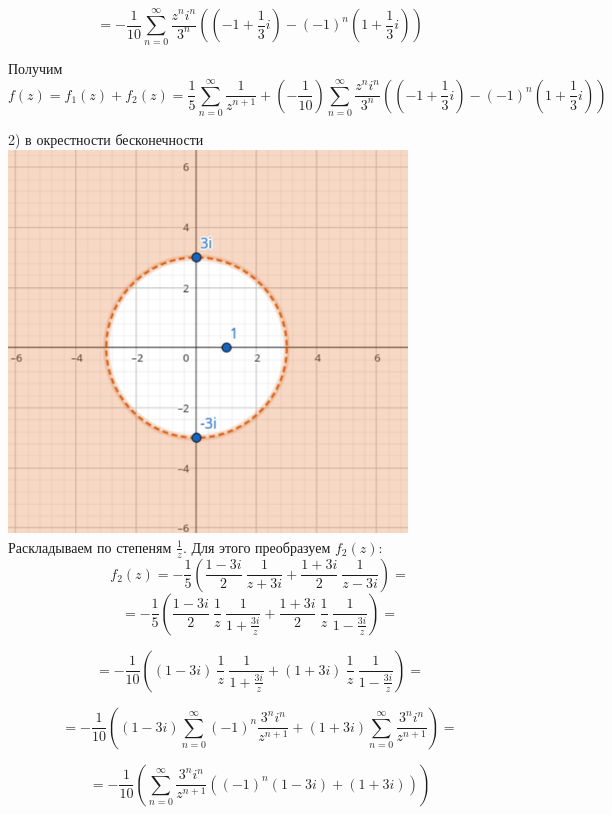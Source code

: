 \documentclass[14pt]{extarticle}
\begin{document}
$$= -\frac{1}{10}\sum_{n=0}^{\infty}\frac{z^ni^n}{3^n}\left(
{\left(-1+\frac{1}{3}i\right)}
-(-1)^n\left(1+\frac{1}{3}i\right)\right)$$

Получим\\
$$f(z) = f_1(z) + f_2(z) 
= \frac{1}{5} \sum_{n=0}^{\infty}\frac{1}{z^{n+1}} +
\left(-\frac{1}{10}\right) \sum_{n=0}^{\infty}\frac{z^ni^n}{3^n}\left(
{\left(-1+\frac{1}{3}i\right)}
-(-1)^n\left(1+\frac{1}{3}i\right)\right)$$

2) в окрестности бесконечности \\
\includegraphics[width=300pt]{img5.png} \\
Раскладываем по степеням $\frac{1}{z}$. Для этого преобразуем $f_2(z):$
$$f_2(z) = -\frac{1}{5} 
\left(\frac{1-3i}{2} \ \frac{1}{z+3i} 
+ \frac{1+3i}{2} \ \frac{1}{z-3i}\right) = $$
$$= -\frac{1}{5} 
\left(\frac{1-3i}{2} \ \frac{1}{z} \ \frac{1}{1+\frac{3i}{z}} 
+ \frac{1+3i}{2} \ \frac{1}{z} \ \frac{1}{1-\frac{3i}{z}}\right) = $$

$$= -\frac{1}{10} 
\left((1-3i) \ \frac{1}{z} \ \frac{1}{1+\frac{3i}{z}} 
+ (1+3i) \ \frac{1}{z} \ \frac{1}{1-\frac{3i}{z}}\right) = $$

$$= -\frac{1}{10} 
\left((1-3i)\sum_{n=0}^{\infty}(-1)^n\frac{3^n i^n}{z^{n+1}}
+ (1+3i)\sum_{n=0}^{\infty}\frac{3^n i^n}{z^{n+1}}\right)=$$

$$= -\frac{1}{10} 
\left(\sum_{n=0}^{\infty}\frac{3^n i^n}{z^{n+1}}
((-1)^n(1-3i)+(1+3i))\right)$$
\end{document}
